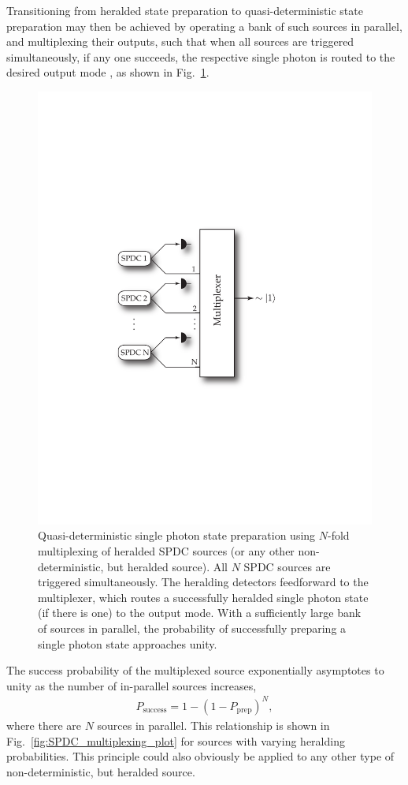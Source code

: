 \documentclass[aps, rmp, twocolumn, amsmath, amssymb, nofootinbib, superscriptaddress, longbibliography, floatfix, table-of-contents, eqsecnum]{revtex4-1}
\begin{document}
Transitioning from heralded state preparation to quasi-deterministic state preparation may then be achieved by operating a bank of such sources in parallel, and multiplexing their outputs, such that when all sources are triggered simultaneously, if any one succeeds, the respective single photon is routed to the desired output mode \cite{???}, as shown in Fig.~\ref{fig:SPDC_multiplexing_arch}.

\begin{figure}[!htb]
\includegraphics[width=0.75\columnwidth]{SPDC_multiplexing_arch}
\caption{Quasi-deterministic single photon state preparation using $N$-fold multiplexing of heralded SPDC sources (or any other non-deterministic, but heralded source). All $N$ SPDC sources are triggered simultaneously. The heralding detectors feedforward to the multiplexer, which routes a successfully heralded single photon state (if there is one) to the output mode. With a sufficiently large bank of sources in parallel, the probability of successfully preparing a single photon state approaches unity.} \label{fig:SPDC_multiplexing_arch}
\end{figure}

The success probability of the multiplexed source exponentially asymptotes to unity as the number of in-parallel sources increases,
\begin{align} \label{eq:SPDC_multiplex}
P_\text{success} = 1 - (1-P_\text{prep})^N,
\end{align}
where there are $N$ sources in parallel. This relationship is shown in Fig.~\ref{fig:SPDC_multiplexing_plot} for sources with varying heralding probabilities. This principle could also obviously be applied to any other type of non-deterministic, but heralded source.
\end{document}

